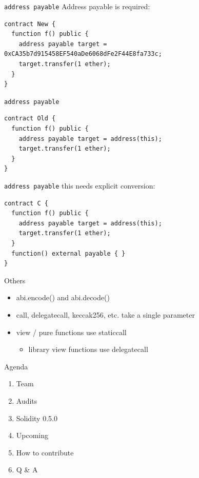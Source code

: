 \documentclass[aspectratio=169,10pt]{beamer}
\begin{document}
\begin{frame}[fragile]{\texttt{address payable}}
  Address payable is required:
  \begin{mdframed}
  \begin{lstlisting}[language=Solidity]
contract New {
  function f() public {
    address payable target = 0xCA35b7d915458EF540aDe6068dFe2F44E8fa733c;
    target.transfer(1 ether);
  }
}
  \end{lstlisting}
  \end{mdframed}
\end{frame}

\begin{frame}[fragile]{\texttt{address payable}}
  \begin{mdframed}
  \begin{lstlisting}[language=Solidity]
contract Old {
  function f() public {
    address payable target = address(this);
    target.transfer(1 ether);
  }
}
  \end{lstlisting}
  \end{mdframed}
\end{frame}

\begin{frame}[fragile]{\texttt{address payable}}
  this needs explicit conversion:
  \begin{mdframed}
  \begin{lstlisting}[language=Solidity]
contract C {
  function f() public {
    address payable target = address(this);
    target.transfer(1 ether);
  }
  function() external payable { }
}
  \end{lstlisting}
  \end{mdframed}
\end{frame}

\begin{frame}[fragile]{Others}
  \begin{itemize}
    \item abi.encode() and abi.decode()
    \item call, delegatecall, keccak256, etc. take a single parameter
    \item view / pure functions use staticcall
    \begin{itemize}
      \item library view functions use delegatecall
    \end{itemize}
  \end{itemize}
\end{frame}

\begin{frame}{Agenda}
	\begin{enumerate}
  \item Team
  \item Audits
	\item Solidity 0.5.0
	\item \alert{Upcoming}
	\item How to contribute
	\item Q \& A
	\end{enumerate}
\end{frame}
\end{document}

